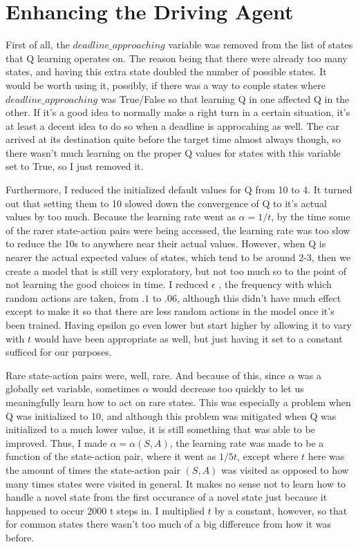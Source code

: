 \documentclass{amsart}
\begin{document}
\section{Enhancing the Driving Agent}
First of all, the $deadline\_approaching$ variable was removed from the list of states that Q learning operates on.  The reason being that there were already too many states, and having this extra state doubled the number of possible states.  It would be worth using it, possibly, if there was a way to couple states where $deadline\_approaching$ was True/False so that learning Q in one affected Q in the other.  If it's a good idea to normally make a right turn in a certain situation, it's at least a decent idea to do so when a deadline is approcahing as well.  The car arrived at its destination quite before the target time almost always though, so there wasn't much learning on the proper Q values for states with this variable set to True, so I just removed it.

Furthermore, I reduced the initialized default values for Q from 10 to 4.  It turned out that setting them to 10 slowed down the convergence of Q to it's actual values by too much.  Because the learning rate went as $\alpha = 1/t$, by the time some of the rarer state-action pairs were being accessed, the learning rate was too slow to reduce the 10s to anywhere near their actual values.  However, when Q is nearer the actual expected values of states, which tend to be around 2-3, then we create a model that is still very exploratory, but not too much so to the point of not learning the good choices in time.   I reduced $\epsilon$ , the frequency with which random actions are taken, from $.1$ to $.06$, although this didn't have much effect except to make it so that there are less random actions in the model once it's been trained.  Having epsilon go even lower but start higher by allowing it to vary with $t$ would have been appropriate as well, but just having it set to a constant sufficed for our purposes.

Rare state-action pairs were, well, rare.  And because of this, since $\alpha$ was a globally set variable, sometimes $\alpha$ would decrease too quickly to let us meaningfully learn how to act on rare states.  This was especially a problem when Q was initialized to 10, and although this problem was mitigated  when Q was initialized to a much lower value, it is still something that was able to be improved.  Thus, I made $\alpha = \alpha(S,A)$, the learning rate was made to be a function of the state-action pair, where it went as $1/5t$, except where $t$ here was the amount of times the state-action pair $(S,A)$ was visited as opposed to how many times states were visited in general.  It makes no sense not to learn how to handle a novel state from the first occurance of a novel state just because it happened to occur 2000 t steps in.  I multiplied $t$ by a constant, however, so that for common states there wasn't too much of a big difference from how it was before.
\end{document}
